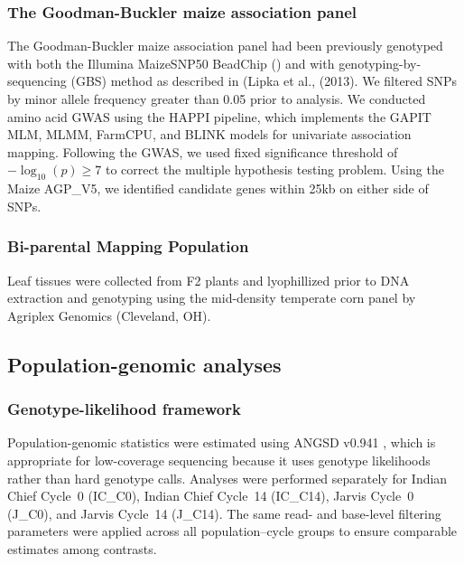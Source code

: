 \subsubsection{The Goodman-Buckler maize association panel}

The Goodman-Buckler maize association panel had been previously genotyped with both the Illumina MaizeSNP50 BeadChip (\cite{FlintGarcia2005Goodman}) and with genotyping-by-sequencing (GBS) method as described in (Lipka et al., (2013). We filtered SNPs by minor allele frequency greater than 0.05 prior to analysis. We conducted amino acid GWAS using the HAPPI pipeline, which implements the GAPIT MLM, MLMM, FarmCPU, and BLINK models for univariate association mapping. Following the GWAS, we used fixed significance threshold of $-\log_{10}(p) \ge 7$ to correct the multiple hypothesis testing problem. Using the Maize AGP\_V5, we identified candidate genes within 25kb on either side of SNPs. 

\subsubsection{Bi-parental Mapping Population}
Leaf tissues were collected from F2 plants and lyophillized prior to DNA extraction and genotyping using the mid-density temperate corn panel by Agriplex Genomics (Cleveland, OH).

\subsection{Population-genomic analyses}

\subsubsection{Genotype-likelihood framework}

Population-genomic statistics were estimated using ANGSD v0.941 \citep{Korneliussen2014ANGSD}, which is appropriate for low-coverage sequencing because it uses genotype likelihoods rather than hard genotype calls. Analyses were performed separately for Indian Chief Cycle~0 (IC\_C0), Indian Chief Cycle~14 (IC\_C14), Jarvis Cycle~0 (J\_C0), and Jarvis Cycle~14 (J\_C14). The same read- and base-level filtering parameters were applied across all population--cycle groups to ensure comparable estimates among contrasts.

